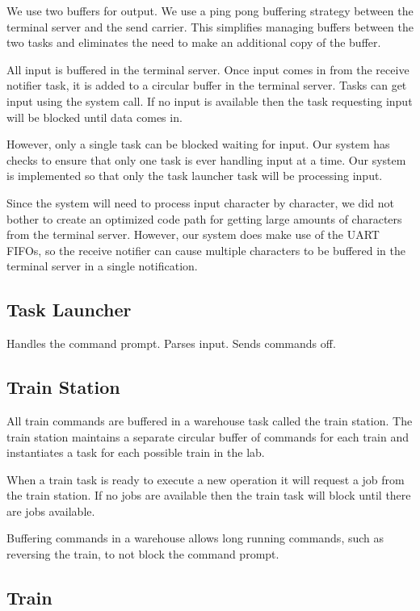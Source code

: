 \documentclass[pdftex,10pt,a4paper]{article}
\begin{document}
We use two buffers for output. We use a ping pong buffering strategy
between the terminal server and the send carrier. This simplifies
managing buffers between the two tasks and eliminates the need to make
an additional copy of the buffer.

All input is buffered in the terminal server. Once input comes in from
the receive notifier task, it is added to a circular buffer in the
terminal server. Tasks can get input using the  system
call. If no input is available then the task requesting input will be
blocked until data comes in.

However, only a single task can be blocked waiting for input. Our
system has checks to ensure that only one task is ever handling input
at a time. Our system is implemented so that only the task launcher
task will be processing input.

Since the system will need to process input character by character, we
did not bother to create an optimized code path for getting large
amounts of characters from the terminal server. However, our system
does make use of the UART FIFOs, so the receive notifier can cause
multiple characters to be buffered in the terminal server in a single
notification.

\subsection*{Task Launcher}

Handles the command prompt. Parses input. Sends commands off.

\subsection*{Train Station}

All train commands are buffered in a warehouse task called the train
station. The train station maintains a separate circular buffer of
commands for each train and instantiates a  task for each
possible train in the lab.

When a train task is ready to execute a new operation it will request
a job from the train station. If no jobs are available then the train
task will block until there are jobs available.

Buffering commands in a warehouse allows long running commands, such
as reversing the train, to not block the command prompt.


\subsection*{Train}
\end{document}
